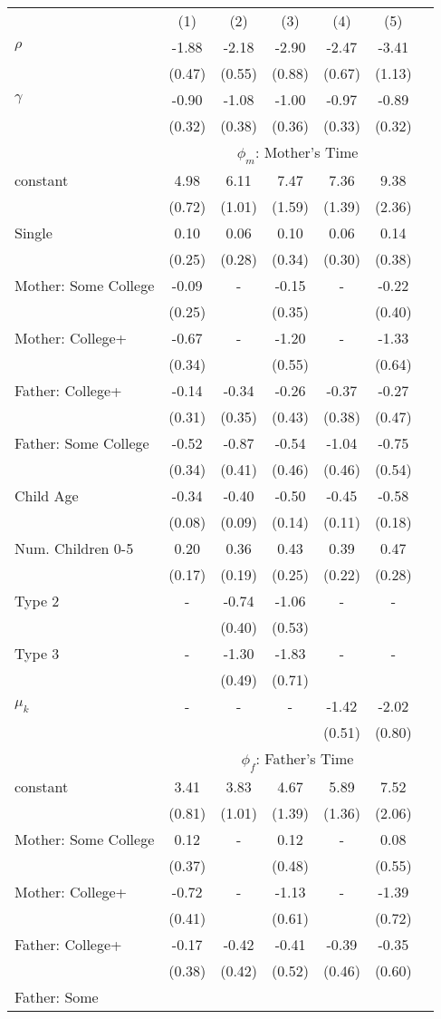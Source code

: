 \begin{tabular}{lcccccc}\\\toprule
&(1)&(2)&(3)&(4)&(5)&\\\cmidrule(r){2-7}$\rho$&-1.88&-2.18&-2.90&-2.47&-3.41&\\
&(0.47)&(0.55)&(0.88)&(0.67)&(1.13)&\\
$\gamma$&-0.90&-1.08&-1.00&-0.97&-0.89&\\
&(0.32)&(0.38)&(0.36)&(0.33)&(0.32)&\\
& \multicolumn{6}{c}{$\phi_{m}$: Mother's Time}\\\cmidrule(r){2-7}constant&4.98&6.11&7.47&7.36&9.38&\\&(0.72)&(1.01)&(1.59)&(1.39)&(2.36)&\\Single&0.10&0.06&0.10&0.06&0.14&\\&(0.25)&(0.28)&(0.34)&(0.30)&(0.38)&\\Mother: Some College&-0.09&-&-0.15&-&-0.22&\\&(0.25)&&(0.35)&&(0.40)&\\Mother: College+&-0.67&-&-1.20&-&-1.33&\\&(0.34)&&(0.55)&&(0.64)&\\Father: College+&-0.14&-0.34&-0.26&-0.37&-0.27&\\&(0.31)&(0.35)&(0.43)&(0.38)&(0.47)&\\Father: Some College&-0.52&-0.87&-0.54&-1.04&-0.75&\\&(0.34)&(0.41)&(0.46)&(0.46)&(0.54)&\\Child Age&-0.34&-0.40&-0.50&-0.45&-0.58&\\&(0.08)&(0.09)&(0.14)&(0.11)&(0.18)&\\Num. Children 0-5&0.20&0.36&0.43&0.39&0.47&\\&(0.17)&(0.19)&(0.25)&(0.22)&(0.28)&\\Type 2&-&-0.74&-1.06&-&-&\\&&(0.40)&(0.53)&&&\\Type 3&-&-1.30&-1.83&-&-&\\&&(0.49)&(0.71)&&&\\$\mu_{k}$&-&-&-&-1.42&-2.02&\\&&&&(0.51)&(0.80)&\\& \multicolumn{6}{c}{$\phi_{f}$: Father's Time}\\\cmidrule(r){2-7}constant&3.41&3.83&4.67&5.89&7.52&\\&(0.81)&(1.01)&(1.39)&(1.36)&(2.06)&\\Mother: Some College&0.12&-&0.12&-&0.08&\\&(0.37)&&(0.48)&&(0.55)&\\Mother: College+&-0.72&-&-1.13&-&-1.39&\\&(0.41)&&(0.61)&&(0.72)&\\Father: College+&-0.17&-0.42&-0.41&-0.39&-0.35&\\&(0.38)&(0.42)&(0.52)&(0.46)&(0.60)&\\Father: Some 
\end{tabular}
